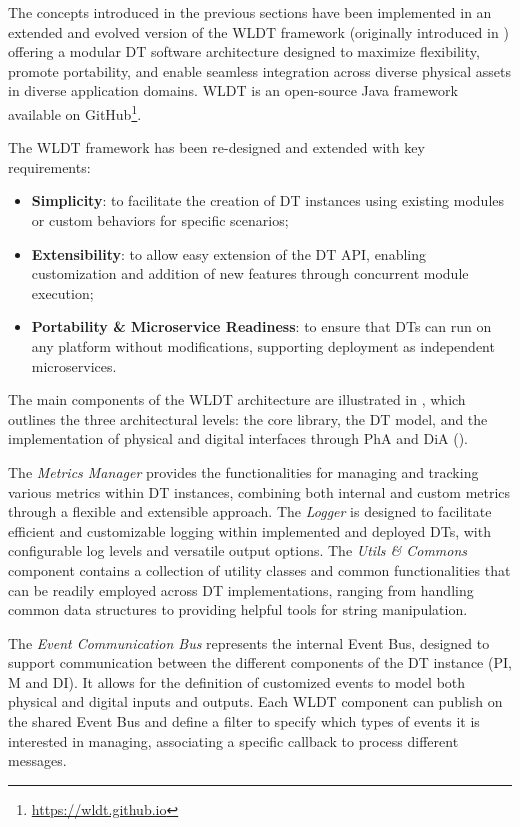 The concepts introduced in the previous sections have been implemented in an extended and evolved version of the \acf{WLDT} framework (originally introduced in \cite{PICONE2021100661}) offering a modular DT software architecture designed to maximize flexibility, promote portability, and enable seamless integration across diverse physical assets in diverse application domains.
%
\ac{WLDT} is an open-source Java framework available on GitHub\footnote{\url{https://wldt.github.io}}.

The \ac{WLDT} framework has been re-designed and extended with key requirements:
\begin{itemize}
    \item \textbf{Simplicity}: to facilitate the creation of \ac{DT} instances using existing modules or custom behaviors for specific scenarios;
    \item \textbf{Extensibility}: to allow easy extension of the \ac{DT} \ac{API}, enabling customization and addition of new features through concurrent module execution;
    \item \textbf{Portability \& Microservice Readiness}: to ensure that \ac{DT}s can run on any platform without modifications, supporting deployment as independent microservices.
\end{itemize}

The main components of the \ac{WLDT} architecture are illustrated in , which outlines the three architectural levels: the core library, the DT model, and the implementation of physical and digital interfaces through \ac{PhA} and \ac{DiA} ().

The \textit{Metrics Manager} provides the functionalities for managing and tracking various metrics within DT instances, combining both internal and custom metrics through a flexible and extensible approach.
The \textit{Logger} is designed to facilitate efficient and customizable logging within implemented and deployed DTs, with configurable log levels and versatile output options.
The \textit{Utils \& Commons} component contains a collection of utility classes and common functionalities that can be readily employed across DT implementations, ranging from handling common data structures to providing helpful tools for string manipulation.

The \textit{Event Communication Bus} represents the internal Event Bus, designed to support communication between the different components of the \ac{DT} instance (\ac{PI}, \ac{M} and \ac{DI}).
%
It allows for the definition of customized events to model both physical and digital inputs and outputs. Each \ac{WLDT} component can publish on the shared Event Bus and define a filter to specify which types of events it is interested in managing, associating a specific callback to process different messages.


